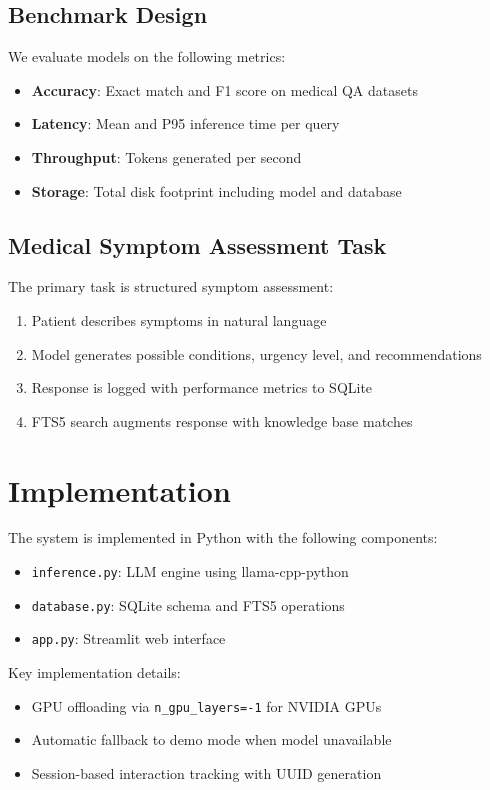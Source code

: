\documentclass[conference]{IEEEtran}
\begin{document}
\subsection{Benchmark Design}

We evaluate models on the following metrics:
\begin{itemize}
    \item \textbf{Accuracy}: Exact match and F1 score on medical QA datasets
    \item \textbf{Latency}: Mean and P95 inference time per query
    \item \textbf{Throughput}: Tokens generated per second
    \item \textbf{Storage}: Total disk footprint including model and database
\end{itemize}

\subsection{Medical Symptom Assessment Task}

The primary task is structured symptom assessment:
\begin{enumerate}
    \item Patient describes symptoms in natural language
    \item Model generates possible conditions, urgency level, and recommendations
    \item Response is logged with performance metrics to SQLite
    \item FTS5 search augments response with knowledge base matches
\end{enumerate}

\section{Implementation}

The system is implemented in Python with the following components:
\begin{itemize}
    \item \texttt{inference.py}: LLM engine using llama-cpp-python
    \item \texttt{database.py}: SQLite schema and FTS5 operations
    \item \texttt{app.py}: Streamlit web interface
\end{itemize}

Key implementation details:
\begin{itemize}
    \item GPU offloading via \texttt{n\_gpu\_layers=-1} for NVIDIA GPUs
    \item Automatic fallback to demo mode when model unavailable
    \item Session-based interaction tracking with UUID generation
\end{itemize}
\end{document}
